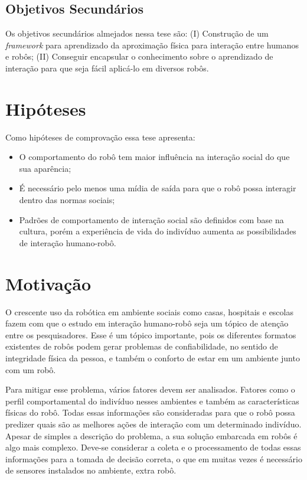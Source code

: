 \subsection{Objetivos Secundários}
Os objetivos secundários almejados nessa tese são: (I) Construção de um \emph{framework} para aprendizado da aproximação física para interação entre humanos e robôs; (II) Conseguir encapsular o conhecimento sobre o aprendizado de interação para que seja fácil aplicá-lo em diversos robôs.

\section{Hipóteses}
Como hipóteses de comprovação essa tese apresenta:

\begin{itemize}
    \item O comportamento do robô tem maior influência na interação social do que sua aparência;
    \item É necessário pelo menos uma mídia de saída para que o robô possa interagir dentro das normas sociais;
    \item Padrões de comportamento de interação social são definidos com base na cultura, porém a experiência de vida do indivíduo aumenta as possibilidades de interação humano-robô.
\end{itemize}

\section{Motivação}
O crescente uso da robótica em ambiente sociais como casas, hospitais e escolas fazem com que o estudo em interação humano-robô seja um tópico de atenção entre os pesquisadores. Esse é um tópico importante, pois os diferentes formatos existentes de robôs podem gerar problemas de confiabilidade, no sentido de integridade física da pessoa, e também o conforto de estar em um ambiente junto com um robô.

Para mitigar esse problema, vários fatores devem ser analisados. Fatores como o perfil comportamental do indivíduo nesses ambientes e também as características físicas do robô. Todas essas informações são consideradas para que o robô possa predizer quais são as melhores ações de interação com um determinado indivíduo. Apesar de simples a descrição do problema, a sua solução embarcada em robôs é algo mais complexo. Deve-se considerar a coleta e o processamento de todas essas informações para a tomada de decisão correta, o que em muitas vezes é necessário de sensores instalados no ambiente, extra robô.

